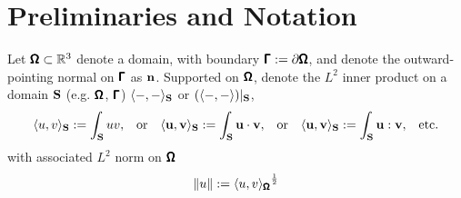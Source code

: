 \section*{Preliminaries and Notation}

    Let $\pmb{\mathsf{\Omega}}  \subset  \mathbb{R}^{3}$ denote a  domain, with boundary $\pmb{\mathsf{\Gamma}}  :=  \partial\pmb{\mathsf{\Omega}}$, and denote the outward-pointing normal on $\pmb{\mathsf{\Gamma}}$ as $\mathbf{n}$. Supported on $\pmb{\mathsf{\Omega}}$, denote the $L^{2}$ inner product on a domain $\mathbf{S}$ (e.g. $\pmb{\mathsf{\Omega}}$, $\pmb{\mathsf{\Gamma}}$) $\langle-, -\rangle_{\mathbf{S}}$ or $(\langle-, -\rangle)|_{\mathbf{S}}$,
    \begin{align}
        \langle u, v\rangle_{\mathbf{S}}  :=  \int_{\mathbf{S}}uv,  &&
        \text{or}  &&
        \langle \mathbf{u}, \mathbf{v}\rangle_{\mathbf{S}}  :=  \int_{\mathbf{S}}\mathbf{u}\cdot\mathbf{v},  &&
        \text{or}  &&
        \langle \mathbf{u}, \mathbf{v}\rangle_{\mathbf{S}}  :=  \int_{\mathbf{S}}\mathbf{u}:\mathbf{v},  &&
        \text{etc.}
    \end{align}
    with associated $L^{2}$ norm on $\pmb{\mathsf{\Omega}}$
    \begin{equation}
        \|u\|  :=  {\langle u, v\rangle_{\pmb{\mathsf{\Omega}}}}^{\frac{1}{2}}
    \end{equation}
    
